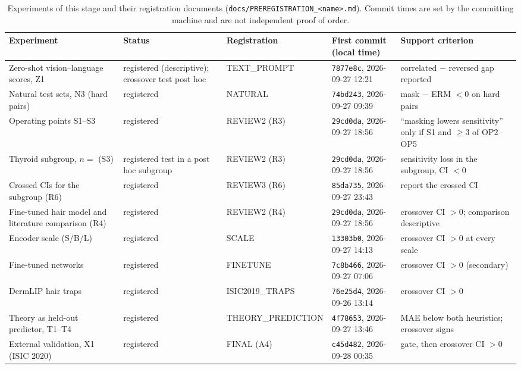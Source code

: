 \begin{table}[H]\centering\scriptsize
\caption{Experiments of this stage and their registration documents (\texttt{docs/PREREGISTRATION\_<name>.md}). Commit times are set by the committing machine and are not independent proof of order.}\label{tab:exp}
\begin{tabular}{p{3.1cm}p{2.1cm}p{2.4cm}p{3.2cm}p{3.3cm}}\toprule
Experiment & Status & Registration & First commit (local time) & Support criterion \\\midrule
Zero-shot vision--language scores, Z1 & \mixed{} registered (descriptive); crossover test post hoc & TEXT\_\allowbreak{}PROMPT & \texttt{7877e8c}, 2026-09-27 12:21 & correlated $-$ reversed gap reported \\
Natural test sets, N3 (hard pairs) & \ok{} registered & NATURAL & \texttt{74bd243}, 2026-09-27 09:39 & mask $-$ ERM $<0$ on hard pairs \\
Operating points S1--S3 & \ok{} registered & REVIEW2 (R3) & \texttt{29cd0da}, 2026-09-27 18:56 & ``masking lowers sensitivity'' only if S1 and $\ge3$ of OP2--OP5 \\
Thyroid subgroup, $n=$\sFiveNConf{} (S3) & \mixed{} registered test in a post hoc subgroup & REVIEW2 (R3) & \texttt{29cd0da}, 2026-09-27 18:56 & sensitivity loss in the subgroup, CI $<0$ \\
Crossed CIs for the subgroup (R6) & \ok{} registered & REVIEW3 (R6) & \texttt{85da735}, 2026-09-27 23:43 & report the crossed CI \\
Fine-tuned hair model and literature comparison (R4) & \ok{} registered & REVIEW2 (R4) & \texttt{29cd0da}, 2026-09-27 18:56 & crossover CI $>0$; comparison descriptive \\
Encoder scale (S/B/L) & \ok{} registered & SCALE & \texttt{13303b0}, 2026-09-27 14:13 & crossover CI $>0$ at every scale \\
Fine-tuned networks & \ok{} registered & FINETUNE & \texttt{7c8b466}, 2026-09-27 07:06 & crossover CI $>0$ (secondary) \\
DermLIP hair traps & \ok{} registered & ISIC2019\_\allowbreak{}TRAPS & \texttt{76e25d4}, 2026-09-26 13:14 & crossover CI $>0$ \\
Theory as held-out predictor, T1--T4 & \ok{} registered & THEORY\_\allowbreak{}PREDICTION & \texttt{4f78653}, 2026-09-27 13:46 & MAE below both heuristics; crossover signs \\
External validation, X1 (ISIC 2020) & \ok{} registered & FINAL (A4) & \texttt{c45d482}, 2026-09-28 00:35 & gate, then crossover CI $>0$ \\
\bottomrule\end{tabular}
\end{table}
